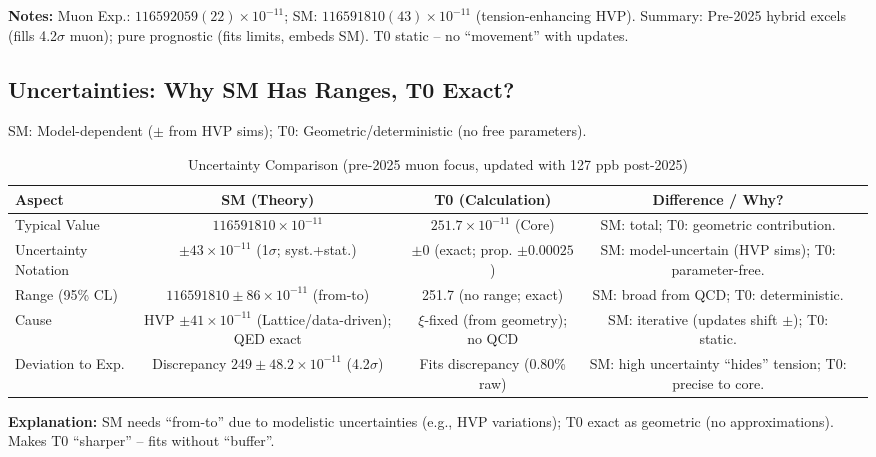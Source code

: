 \documentclass[12pt,a4paper]{article}
\begin{document}
	\textbf{Notes:} Muon Exp.: $116592059(22) \times 10^{-11}$; SM: $116591810(43) \times 10^{-11}$ (tension-enhancing HVP). Summary: Pre-2025 hybrid excels (fills 4.2$\sigma$ muon); pure prognostic (fits limits, embeds SM). T0 static -- no ``movement'' with updates.
	
	\subsection{Uncertainties: Why SM Has Ranges, T0 Exact?}
	
	SM: Model-dependent ($\pm$ from HVP sims); T0: Geometric/deterministic (no free parameters).
	
	\begin{table}[ht!]
		\centering
		\small
		\begin{adjustbox}{max width=\textwidth}
			\begin{tabular}{lcccr}
				\toprule
				Aspect & SM (Theory) & T0 (Calculation) & Difference / Why? \\
				\midrule
				Typical Value & $116591810 \times 10^{-11}$ & $251.7 \times 10^{-11}$ (Core) & SM: total; T0: geometric contribution. \\
				Uncertainty Notation & $\pm 43 \times 10^{-11}$ (1$\sigma$; syst.+stat.) & $\pm 0$ (exact; prop. $\pm 0.00025$) & SM: model-uncertain (HVP sims); T0: parameter-free. \\
				Range (95\% CL) & $116591810 \pm 86 \times 10^{-11}$ (from-to) & 251.7 (no range; exact) & SM: broad from QCD; T0: deterministic. \\
				Cause & HVP $\pm 41 \times 10^{-11}$ (Lattice/data-driven); QED exact & $\xi$-fixed (from geometry); no QCD & SM: iterative (updates shift $\pm$); T0: static. \\
				Deviation to Exp. & Discrepancy $249 \pm 48.2 \times 10^{-11}$ (4.2$\sigma$) & Fits discrepancy (0.80\% raw) & SM: high uncertainty ``hides'' tension; T0: precise to core. \\
				\bottomrule
			\end{tabular}
		\end{adjustbox}
		\caption{Uncertainty Comparison (pre-2025 muon focus, updated with 127 ppb post-2025)}
		\label{tab:uncertainties}
	\end{table}
	
	\textbf{Explanation:} SM needs ``from-to'' due to modelistic uncertainties (e.g., HVP variations); T0 exact as geometric (no approximations). Makes T0 ``sharper'' -- fits without ``buffer''.
	
\end{document}
